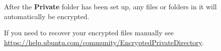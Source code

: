 After the \textbf{Private} folder has been set up, any files or folders in it will automatically be encrypted.

If you need to recover your encrypted files manually see \url{https://help.ubuntu.com/community/EncryptedPrivateDirectory}.

